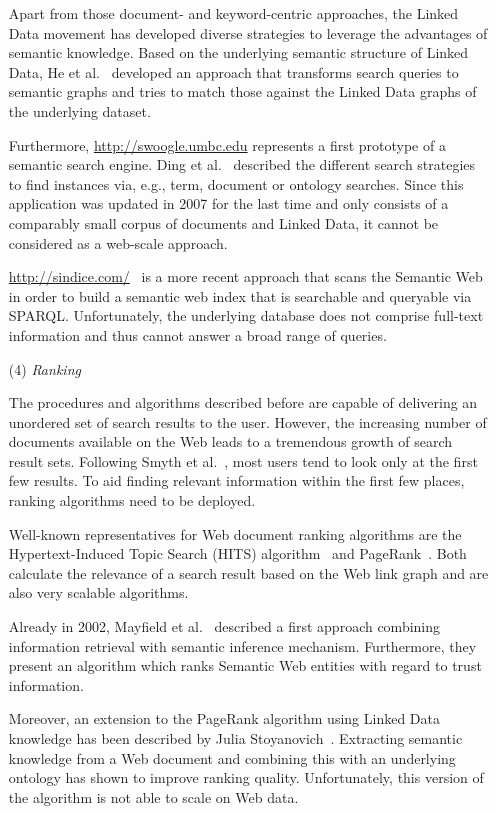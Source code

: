 \begin{itemize}
Apart from those document- and keyword-centric approaches, the Linked Data movement has developed diverse strategies to leverage the advantages of semantic knowledge.
Based on the underlying semantic structure of Linked Data, He et al.~\cite{graphBasedSemanticIndexing} developed an approach that transforms search queries to semantic graphs and tries to match those against the Linked Data graphs of the underlying dataset.

Furthermore, \url{http://swoogle.umbc.edu} represents a first prototype of a semantic search engine.  	
Ding et al.~\cite{Ding05findingand} described the different search strategies to find instances via, e.g., term, document or ontology searches.
Since this application was updated in 2007 for the last time and only consists of a comparably small corpus of documents and Linked Data, it cannot be considered as a web-scale approach.

\url{http://sindice.com/}~\cite{sindice} is a more recent approach that scans the Semantic Web in order to build a semantic web index that is searchable and queryable via SPARQL.
Unfortunately, the underlying database does not comprise full-text information and thus cannot answer a broad range of queries.

\item[(4)]
\emph{Ranking}

The procedures and algorithms described before are capable of delivering an unordered set of search results to the user. 
However, the increasing number of documents available on the Web leads to a tremendous growth of search result sets. 
Following Smyth et al.~\cite{Smyth05alive-user}, most users tend to look only at the first few results.
To aid finding relevant information within the first few places, ranking algorithms need to be deployed.

Well-known representatives for Web document ranking algorithms are the Hypertext-Induced Topic Search (HITS) algorithm~\cite{HITS} and \mbox{PageRank~\cite{PageRank}}. Both calculate the relevance of a search result based on the Web link graph and are also very scalable algorithms.

Already in 2002, Mayfield et al.~\cite{MF03,Shah:2002} described a first approach combining information retrieval with semantic inference mechanism. Furthermore, they present an algorithm which ranks Semantic Web entities with regard to trust information.

Moreover, an extension to the PageRank algorithm using Linked Data knowledge has been described by Julia Stoyanovich~\cite{Stoyanovich}. Extracting semantic knowledge from a Web document and combining this with an underlying ontology has shown to improve ranking quality. Unfortunately, this version of the algorithm is not able to scale on Web data. 


\end{itemize}
